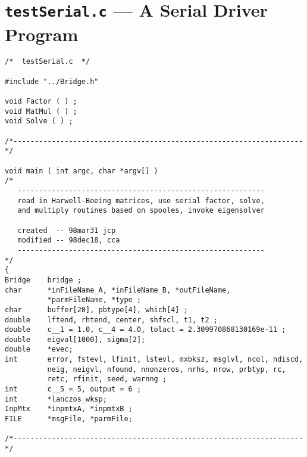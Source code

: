 \chapter{{\tt testSerial.c} --- A Serial Driver Program}
\label{chapter:serial_driver}

\begin{verbatim}
/*  testSerial.c  */

#include "../Bridge.h"

void Factor ( ) ;
void MatMul ( ) ;
void Solve ( ) ;

/*--------------------------------------------------------------------*/

void main ( int argc, char *argv[] )
/*
   ----------------------------------------------------------
   read in Harwell-Boeing matrices, use serial factor, solve,
   and multiply routines based on spooles, invoke eigensolver

   created  -- 98mar31 jcp
   modified -- 98dec18, cca
   ----------------------------------------------------------
*/
{
Bridge    bridge ;
char      *inFileName_A, *inFileName_B, *outFileName, 
          *parmFileName, *type ;
char      buffer[20], pbtype[4], which[4] ;
double    lftend, rhtend, center, shfscl, t1, t2 ;
double    c__1 = 1.0, c__4 = 4.0, tolact = 2.309970868130169e-11 ;
double    eigval[1000], sigma[2];
double    *evec;
int       error, fstevl, lfinit, lstevl, mxbksz, msglvl, ncol, ndiscd,
          neig, neigvl, nfound, nnonzeros, nrhs, nrow, prbtyp, rc, 
          retc, rfinit, seed, warnng ;
int       c__5 = 5, output = 6 ;
int       *lanczos_wksp;
InpMtx    *inpmtxA, *inpmtxB ;
FILE      *msgFile, *parmFile;

/*--------------------------------------------------------------------*/


\end{verbatim}

